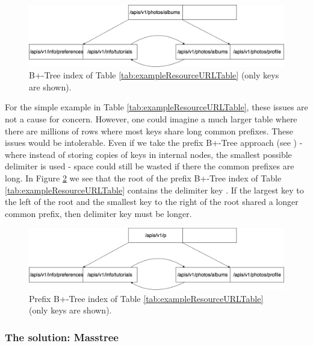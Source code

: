 \begin{figure}[h]
    \centering
    \includegraphics[scale=0.3]{figures/urlexamplebtree.png}
    \caption{B+-Tree index of Table \ref{tab:exampleResourceURLTable} (only keys are shown).}
    \label{fig:urlExampleB+-Tree}
\end{figure}

For the simple example in Table \ref{tab:exampleResourceURLTable}, these issues are not a cause for concern. However, one could imagine a much larger table where there are millions of rows where most keys share long common prefixes. These issues would be intolerable. Even if we take the prefix B+-Tree approach (see \cite{comer1979ubiquitous,ramakrishnan2000database}) - where instead of storing copies of keys in internal nodes, the smallest possible delimiter is used - space could still be wasted if there the common prefixes are long. In Figure \ref{fig:urlExamplePrefixB+-Tree} we see that the root of the prefix B+-Tree index of Table \ref{tab:exampleResourceURLTable} contains the delimiter key . If the largest key to the left of the root and the smallest key to the right of the root shared a longer common prefix, then delimiter key must be longer.


\begin{figure}[h]
    \centering
    \includegraphics[scale=0.3]{figures/urlexampleprefixbtree.png}
    \caption{Prefix B+-Tree index of Table \ref{tab:exampleResourceURLTable} (only keys are shown).}
    \label{fig:urlExamplePrefixB+-Tree}
\end{figure}


\subsubsection{The solution: Masstree}

